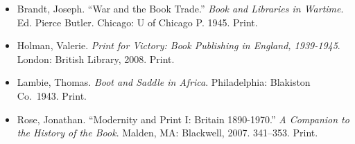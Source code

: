 \documentclass[
  12pt,
]{article}
\begin{document}
\begin{itemize}
\item
  Brandt, Joseph. ``War and the Book Trade.'' \emph{Book and Libraries
  in Wartime}. Ed. Pierce Butler. Chicago: U of Chicago P. 1945. Print.
\item
  Holman, Valerie. \emph{Print for Victory: Book Publishing in England,
  1939-1945}. London: British Library, 2008. Print.
\item
  Lambie, Thomas. \emph{Boot and Saddle in Africa}. Philadelphia:
  Blakiston Co.~1943. Print.
\item
  Rose, Jonathan. ``Modernity and Print I: Britain 1890-1970.'' \emph{A
  Companion to the History of the Book}. Malden, MA: Blackwell, 2007.
  341--353. Print.
\end{itemize}
\end{document}
